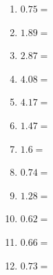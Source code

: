 \documentclass[12pt]{article}
\begin{document}
\begin{enumerate}
\item \large $ 0.75 = $ \vspace{1.5cm}
\item \large $ 1.89 = $ \vspace{1.5cm}
\newpage
\item \large $ 2.87 = $ \vspace{1.5cm}
\item \large $ 4.08 = $ \vspace{1.5cm}
\item \large $ 4.17 = $ \vspace{1.5cm}
\item \large $ 1.47 = $ \vspace{1.5cm}
\item \large $ 1.6 = $ \vspace{1.5cm}
\item \large $ 0.74 = $ \vspace{1.5cm}
\item \large $ 1.28 = $ \vspace{1.5cm}
\item \large $ 0.62 = $ \vspace{1.5cm}
\item \large $ 0.66 = $ \vspace{1.5cm}
\item \large $ 0.73 = $ \vspace{1.5cm}
\end{enumerate}\newpage
\end{document}

